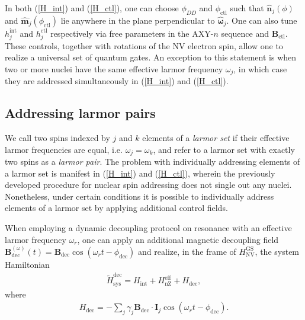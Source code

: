\documentclass[twocolumn]{revtex4}
\renewcommand{\t}{\text} %
\newcommand{\p}[1]{\left(#1\right)} %
\renewcommand{\v}{\bm} %
\newcommand{\uv}[1]{\hat{\v{#1}}} %
\renewcommand{\c}{\cdot} %
\newcommand{\NV}{\t{NV}}
\begin{document}
In both (\ref{H_int}) and (\ref{H_ctl}), one can choose $\phi_{DD}$
and $\phi_\t{ctl}$ such that $\uv n_j\p\phi$ and
$\uv m_j\p{\phi_\t{ctl}}$ lie anywhere in the plane perpendicular to
$\uv\omega_j$. One can also tune $h_j^\t{int}$ and $h_j^\t{ctl}$
respectively via free parameters in the AXY-$n$ sequence and
$\v B_\t{ctl}$. These controls, together with rotations of the NV
electron spin, allow one to realize a universal set of quantum
gates. An exception to this statement is when two or more nuclei have
the same effective larmor frequency $\omega_j$, in which case they are
addressed simultaneously in (\ref{H_int}) and (\ref{H_ctl}).

\subsection{Addressing larmor pairs}

We call two spins indexed by $j$ and $k$ elements of a \emph{larmor
  set} if their effective larmor frequencies are equal,
i.e. $\omega_j=\omega_k$, and refer to a larmor set with exactly two
spins as a \emph{larmor pair}. The problem with individually
addressing elements of a larmor set is manifest in (\ref{H_int}) and
(\ref{H_ctl}), wherein the previously developed procedure for nuclear
spin addressing does not single out any nuclei. Nonetheless, under
certain conditions it is possible to individually address elements of
a larmor set by applying additional control fields.

When employing a dynamic decoupling protocol on resonance with an
effective larmor frequency $\omega_r$, one can apply an additional
magnetic decoupling field
$\v B_\t{dec}^{\p\omega}\p{t}=\v B_\t{dec}\cos\p{\omega_r
  t-\phi_\t{dec}}$ and realize, in the frame of $H_\NV^\t{GS}$, the
system Hamiltonian
\begin{align}
  \tilde H_\t{sys}^\t{dec} = H_\t{int} + H_\t{nZ}^\t{eff} + H_\t{dec},
\end{align}
where
\begin{align}
  H_\t{dec} = -\sum_j\gamma_j\v B_\t{dec}\c\v I_j
  \cos\p{\omega_rt-\phi_\t{dec}}.
\end{align}
\end{document}
